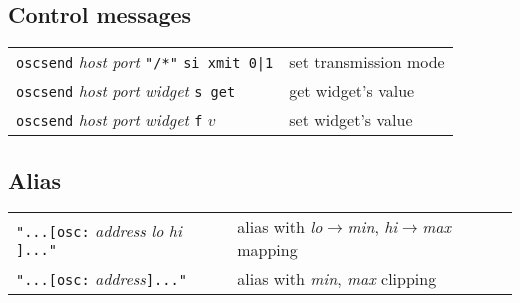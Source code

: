 \subsection*{Control messages}

\begin{tabular}{ll}
\lstinline'oscsend' \emph{host} \emph{port} \lstinline'"/*"' \lstinline'si xmit 0|1' & set transmission mode \\
\lstinline'oscsend' \emph{host} \emph{port} \emph{widget} \lstinline's get' & get widget's value \\
\lstinline'oscsend' \emph{host} \emph{port} \emph{widget} \lstinline'f' $v$ & set widget's value
\end{tabular}

\subsection*{Alias}

\begin{tabular}{ll}
\lstinline'"...[osc:' \emph{address}  \emph{lo}  \emph{hi} \lstinline']..."' & alias with \emph{lo}$\rightarrow$\emph{min}, \emph{hi}$\rightarrow$\emph{max} mapping\\
\lstinline'"...[osc:' \emph{address}\lstinline']..."' & alias with \emph{min}, \emph{max} clipping
\end{tabular}

